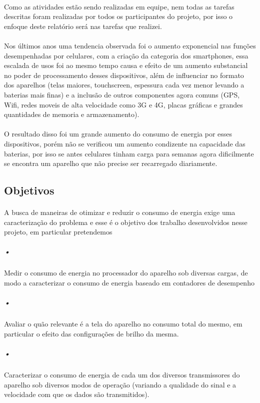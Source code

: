 \documentclass[11pt,a4paper,titlepage]{article}
\begin{document}
\paragraph{} Como as atividades estão sendo realizadas em equipe, nem todas as tarefas descritas foram realizadas por todos os participantes do projeto, por isso o enfoque deste relatório será nas tarefas que realizei.
\paragraph{} Nos últimos anos uma tendencia observada foi o aumento exponencial nas funções desempenhadas por celulares, com a criação da categoria dos smartphones, essa escalada de usos foi ao mesmo tempo causa e efeito de um aumento substancial no poder de processamento desses dispositivos, além de influenciar no formato dos aparelhos (telas maiores, touchscreen, espessura cada vez menor levando a baterias mais finas) e a inclusão de outros componentes agora comuns (GPS, Wifi, redes moveis de alta velocidade como 3G e 4G, placas gráficas e grandes quantidades de memoria e armazenamento).
\paragraph{} O resultado disso foi um grande aumento do consumo de energia por esses dispositivos, porém não se verificou um aumento condizente na capacidade das baterias, por isso se antes celulares tinham carga para semanas agora dificilmente se encontra um aparelho que não precise ser recarregado diariamente.
\subsection{Objetivos}
\paragraph{} A busca de maneiras de otimizar e reduzir o consumo de energia exige uma caracterização do problema e esse é o objetivo dos trabalho desenvolvidos nesse projeto, em particular pretendemos 
\subparagraph{•} Medir o consumo de energia no processador do aparelho sob diversas cargas, de modo a caracterizar o consumo de energia baseado em contadores de desempenho
\subparagraph{•} Avaliar o quão relevante é a tela do aparelho no consumo total do mesmo, em particular o efeito das configurações de brilho da mesma.
\subparagraph{•} Caracterizar o consumo de energia de cada um dos diversos transmissores do aparelho sob diversos modos de operação (variando a qualidade do sinal e a velocidade com que os dados são transmitidos).
\end{document}
